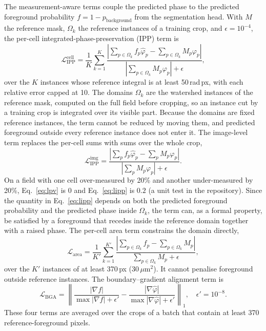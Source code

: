 \documentclass[11pt]{article}
\newcommand{\Lippc}{\mathcal{L}_\mathrm{IPP}^\mathrm{cell}}
\newcommand{\Lippi}{\mathcal{L}_\mathrm{IPP}^\mathrm{img}}
\newcommand{\Larea}{\mathcal{L}_\mathrm{area}}
\newcommand{\Lbga}{\mathcal{L}_\mathrm{BGA}}
\begin{document}
The measurement-aware terms couple the predicted phase to the predicted
foreground probability $f = 1 - p_\mathrm{background}$ from the segmentation
head. With $M$ the reference mask, $\Omega_k$ the reference instances of a
training crop, and $\epsilon = 10^{-4}$, the per-cell
integrated-phase-preservation (IPP) term is
\begin{equation}
\Lippc = \frac{1}{K}\sum_{k=1}^{K}
\frac{\left|\sum_{p\in\Omega_k} f_p\hat{\varphi}_p
           - \sum_{p\in\Omega_k} M_p\varphi_p\right|}
     {\left|\sum_{p\in\Omega_k} M_p\varphi_p\right| + \epsilon} ,
\label{eq:lipp}
\end{equation}
over the $K$ instances whose reference integral is at least 50\,rad\,px, with
each relative error capped at 10. The domains $\Omega_k$ are the watershed
instances of the reference mask, computed on the full field before cropping, so
an instance cut by a training crop is integrated over its visible part. Because
the domains are fixed reference instances, the term cannot be reduced by moving
them, and predicted foreground outside every reference instance does not enter
it. The image-level term replaces the per-cell sums with sums over the whole
crop,
\begin{equation}
\Lippi = \frac{\left|\sum_p f_p\hat{\varphi}_p - \sum_p M_p\varphi_p\right|}
            {\left|\sum_p M_p\varphi_p\right| + \epsilon} .
\label{eq:lpv}
\end{equation}
On a field with one cell over-measured by 20\% and another under-measured by
20\%, Eq.~\eqref{eq:lpv} is $0$ and Eq.~\eqref{eq:lipp} is $0.2$ (a unit test in
the repository). Since the quantity in Eq.~\eqref{eq:lipp} depends on both the
predicted foreground probability and the predicted phase inside $\Omega_k$, the
term can, as a formal property, be satisfied by a foreground that recedes inside
the reference domain together with a raised phase. The per-cell area term
constrains the domain directly,
\begin{equation}
\Larea = \frac{1}{K'}\sum_{k=1}^{K'}
\frac{\left|\sum_{p\in\Omega_k} f_p - \sum_{p\in\Omega_k} M_p\right|}
     {\sum_{p\in\Omega_k} M_p + \epsilon} ,
\label{eq:larea}
\end{equation}
over the $K'$ instances of at least 370\,px ($30\,\mu$m$^2$). It cannot penalise
foreground outside reference instances. The boundary--gradient alignment term
is
\begin{equation}
\Lbga = \left\|
\frac{|\nabla f|}{\max|\nabla f| + \epsilon'} -
\frac{|\nabla \hat\varphi|}{\max|\nabla \hat\varphi| + \epsilon'}
\right\|_1 ,\quad \epsilon'=10^{-8}.
\label{eq:lbga}
\end{equation}
These four terms are averaged over the crops of a batch that contain at least
370 reference-foreground pixels.
\end{document}

